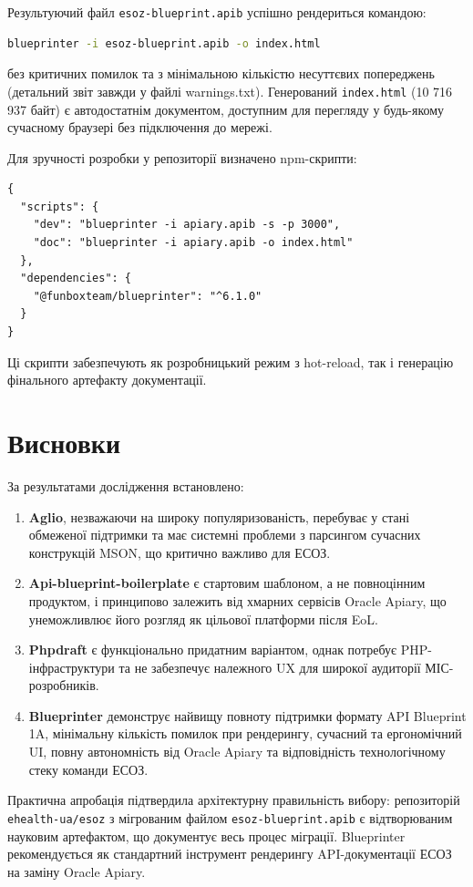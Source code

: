\documentclass{article}
\begin{document}
Результуючий файл \texttt{esoz-blueprint.apib} успішно рендериться командою:
\begin{lstlisting}[language=bash]
blueprinter -i esoz-blueprint.apib -o index.html
\end{lstlisting}
без критичних помилок та з мінімальною кількістю несуттєвих попереджень (детальний звіт завжди у файлі warnings.txt). Генерований \texttt{index.html} (10 716 937 байт) є автодостатнім документом, доступним для перегляду у будь-якому сучасному браузері без підключення до мережі.

Для зручності розробки у репозиторії визначено npm-скрипти:
\begin{lstlisting}[language={}]
{
  "scripts": {
    "dev": "blueprinter -i apiary.apib -s -p 3000",
    "doc": "blueprinter -i apiary.apib -o index.html"
  },
  "dependencies": {
    "@funboxteam/blueprinter": "^6.1.0"
  }
}
\end{lstlisting}
Ці скрипти забезпечують як розробницький режим з hot-reload, так і генерацію фінального артефакту документації.

\section{Висновки}
За результатами дослідження встановлено:
\begin{enumerate}
\item \textbf{Aglio}, незважаючи на широку популяризованість, перебуває у стані обмеженої підтримки та має системні проблеми з парсингом сучасних конструкцій MSON, що критично важливо для ЕСОЗ.
\item \textbf{Api-blueprint-boilerplate} є стартовим шаблоном, а не повноцінним продуктом, і принципово залежить від хмарних сервісів Oracle Apiary, що унеможливлює його розгляд як цільової платформи після EoL.
\item \textbf{Phpdraft} є функціонально придатним варіантом, однак потребує PHP-інфраструктури та не забезпечує належного UX для широкої аудиторії МІС-розробників.
\item \textbf{Blueprinter} демонструє найвищу повноту підтримки формату API Blueprint 1A, мінімальну кількість помилок при рендерингу, сучасний та ергономічний UI, повну автономність від Oracle Apiary та відповідність технологічному стеку команди ЕСОЗ.
\end{enumerate}

Практична апробація підтвердила архітектурну правильність вибору: репозиторій \texttt{ehealth-ua/esoz} з мігрованим файлом \texttt{esoz-blueprint.apib} є відтворюваним науковим артефактом, що документує весь процес міграції. Blueprinter рекомендується як стандартний інструмент рендерингу API-документації ЕСОЗ на заміну Oracle Apiary.
\end{document}
